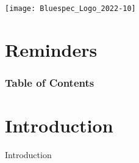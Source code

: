 


\date{L12: RISC-V: Functional Verification of CPUs}





\begin{frame}
\titlepage

\begin{center}
 \texttt{[image: Bluespec\_Logo\_2022-10]}
\end{center}

\end{frame}


\section{Reminders}




\begin{frame}
\frametitle{Table of Contents}

\tableofcontents

\end{frame}


\section{Introduction}

\begin{frame}

\begin{center}
  {\LARGE Introduction}
\end{center}

\end{frame}


